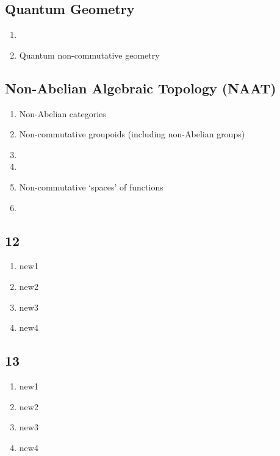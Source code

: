 \documentclass[12pt]{article}
\theoremstyle{plain}
\theoremstyle{definition}
\numberwithin{equation}{section}
\begin{document}
\subsection{Quantum Geometry}
\begin{enumerate}
\item {}
\item Quantum non-commutative geometry
\end{enumerate}


\subsection{Non-Abelian Algebraic Topology (NAAT)}

\begin{enumerate}
\item Non-Abelian categories
\item Non-commutative groupoids (including non-Abelian groups)
\item {}
\item {}
\item Non-commutative `spaces' of functions
\item {}


\end{enumerate}


\subsection{12}


\begin{enumerate}

\item new1

\item new2
\item new3
\item new4

\end{enumerate}


\subsection{13}
\begin{enumerate}

\item new1
\item new2
\item new3
\item new4

\end{enumerate}
\end{document}
